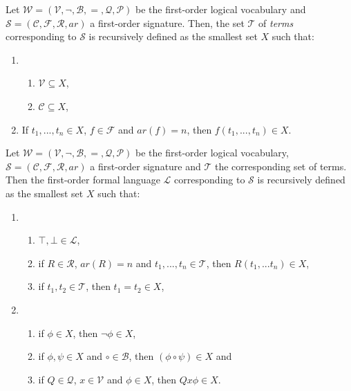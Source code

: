 \begin{definition}\label{def:FO-term}
    Let $\mathcal{W} = (\mathcal{V},\neg,\mathcal{B},=,\mathcal{Q},\mathcal{P})$ be the first-order logical vocabulary and $\mathcal{S} = (\mathcal{C},\mathcal{F},\mathcal{R},ar)$ a first-order signature. Then, the set $\mathcal{T}$ of \textit{terms} corresponding to $\mathcal{S}$ is recursively defined as the smallest set $X$ such that:
    \begin{enumerate}
        \item \begin{enumerate}
            \item $\mathcal{V} \subseteq X$,
            \item $\mathcal{C} \subseteq X$,
        \end{enumerate}
        \item If $t_1,...,t_n \in X$, $f \in \mathcal{F}$ and $ar(f) = n$, then $f(t_1,...,t_n) \in X$.
    \end{enumerate}
\end{definition}

\begin{definition}\label{def:FO-language}
    Let $\mathcal{W} = (\mathcal{V},\neg,\mathcal{B},=,\mathcal{Q},\mathcal{P})$ be the first-order logical vocabulary, $\mathcal{S} = (\mathcal{C},\mathcal{F},\mathcal{R},ar)$ a first-order signature and $\mathcal{T}$ the corresponding set of terms. Then the first-order formal language $\mathcal{L}$ corresponding to $\mathcal{S}$ is recursively defined as the smallest set $X$ such that:
    \begin{enumerate}
        \item \begin{enumerate}
            \item $\top,\bot \in \mathcal{L}$,
            \item if $R \in \mathcal{R}$, $ar(R) = n$ and $t_1,...,t_n \in \mathcal{T}$, then $R(t_1,...t_n) \in X$,
            \item if $t_1,t_2 \in \mathcal{T}$, then $t_1 = t_2 \in X$, 
        \end{enumerate}
        \item \begin{enumerate}
            \item if $\phi \in X$, then $\neg \phi \in X$,
            \item if $\phi, \psi \in X$ and $\circ \in \mathcal{B}$, then $(\phi \circ \psi) \in X$ and
            \item if $Q \in \mathcal{Q}$, $x \in \mathcal{V}$ and $\phi \in X$, then $Qx\phi \in X$.
        \end{enumerate}
    \end{enumerate}
\end{definition}

